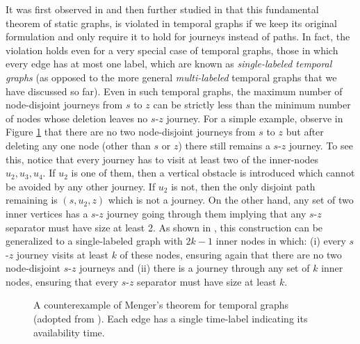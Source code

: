 \documentclass[oribibl, 11pt]{llncs}
\begin{document}
It was first observed in \cite{Be96} and then further studied in \cite{KKK00} that this fundamental theorem of static graphs, is violated in temporal graphs if we keep its original formulation and only require it to hold for journeys instead of paths. In fact, the violation holds even for a very special case of temporal graphs, those in which every edge has at most one label, which are known as \emph{single-labeled temporal graphs} (as opposed to the more general \emph{multi-labeled} temporal graphs that we have discussed so far). Even in such temporal graphs, the maximum number of node-disjoint journeys from $s$ to $z$ can be strictly less than the minimum number of nodes whose deletion leaves no $s$-$z$ journey. For a simple example, observe in Figure \ref{fig:ber} that there are no two node-disjoint journeys from $s$ to $z$ but after deleting any one node (other than $s$ or $z$) there still remains a $s$-$z$ journey. To see this, notice that every journey has to visit at least two of the inner-nodes $u_2,u_3,u_4$. If $u_2$ is one of them, then a vertical obstacle is introduced which cannot be avoided by any other journey. If $u_2$ is not, then the only disjoint path remaining is $(s,u_2,z)$ which is not a journey. On the other hand, any set of two inner vertices has a $s$-$z$ journey going through them implying that any $s$-$z$ separator must have size at least 2. As shown in \cite{KKK00}, this construction can be generalized to a single-labeled graph with $2k-1$ inner nodes in which: (i) every $s$-$z$ journey visits at least $k$ of these nodes, ensuring again that there are no two node-disjoint $s$-$z$ journeys and (ii) there is a journey through any set of $k$ inner nodes, ensuring that every $s$-$z$ separator must have size at least $k$.

\begin{figure}[!hbtp]
   \caption{A counterexample of Menger's theorem for temporal graphs (adopted from \cite{KKK00}). Each edge has a single time-label indicating its availability time.} \label{fig:ber}
\end{figure} 
\end{document}

